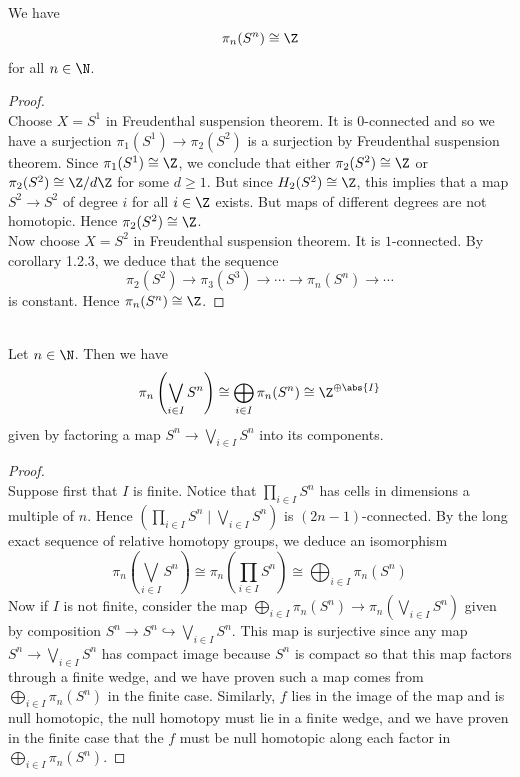 \documentclass[a4paper]{article}
\begin{document}
\begin{crl}{}{}\\
We have $$\pi_n(S^n)\cong\Z$$ for all $n\in\N$. 
\begin{proof}\\
Choose $X=S^1$ in Freudenthal suspension theorem. It is $0$-connected and so we have a surjection $\pi_1(S^1)\to\pi_2(S^2)$ is a surjection by Freudenthal suspension theorem. Since $\pi_1(S^1)\cong\Z$, we conclude that either $\pi_2(S^2)\cong\Z$ or $\pi_2(S^2)\cong\Z/d\Z$ for some $d\geq 1$. But since $H_2(S^2)\cong\Z$, this implies that a map $S^2\to S^2$ of degree $i$ for all $i\in\Z$ exists. But maps of different degrees are not homotopic. Hence $\pi_2(S^2)\cong\Z$. \\

Now choose $X=S^2$ in Freudenthal suspension theorem. It is $1$-connected. By corollary 1.2.3, we deduce that the sequence $$\pi_2(S^2)\to\pi_3(S^3)\to\cdots\to\pi_n(S^n)\to\cdots$$ is constant. Hence $\pi_n(S^n)\cong\Z$. 
\end{proof}
\end{crl}

\begin{eg}{}{}\\
Let $n\in\N$. Then we have $$\pi_n\left(\bigvee_{i\in I}S^n\right)\cong\bigoplus_{i\in I}\pi_n(S^n)\cong\Z^{\oplus\abs{I}}$$ given by factoring a map $S^n\to\bigvee_{i\in I}S^n$ into its components. 
\begin{proof}\\
Suppose first that $I$ is finite. Notice that $\prod_{i\in I}S^n$ has cells in dimensions a multiple of $n$. Hence $\left(\prod_{i\in I}S^n\;|\;\bigvee_{i\in I}S^n\right)$ is $(2n-1)$-connected. By the long exact sequence of relative homotopy groups, we deduce an isomorphism $$\pi_n\left(\bigvee_{i\in I}S^n\right)\cong\pi_n\left(\prod_{i\in I}S^n\right)\cong\bigoplus_{i\in I}\pi_n(S^n)$$ Now if $I$ is not finite, consider the map $\bigoplus_{i\in I}\pi_n(S^n)\to\pi_n\left(\bigvee_{i\in I}S^n\right)$ given by composition $S^n\to S^n\hookrightarrow\bigvee_{i\in I}S^n$. This map is surjective since any map $S^n\to\bigvee_{i\in I}S^n$ has compact image because $S^n$ is compact so that this map factors through a finite wedge, and we have proven such a map comes from $\bigoplus_{i\in I}\pi_n(S^n)$ in the finite case. Similarly, $f$ lies in the image of the map and is null homotopic, the null homotopy must lie in a finite wedge, and we have proven in the finite case that the $f$ must be null homotopic along each factor in $\bigoplus_{i\in I}\pi_n(S^n)$. 
\end{proof}
\end{eg}
\end{document}
